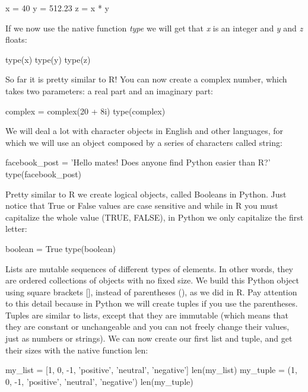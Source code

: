 \begin{examplepy}
x = 40
y = 512.23
z = x * y
\end{examplepy}

If we now use the native function \emph{type} we will get that \emph{x} is an integer and \emph{y} and \emph{z} floats:

\begin{examplepy}
type(x)
type(y)
type(z)
\end{examplepy}

So far it is pretty similar to R! You can now create a complex number, which takes two parameters: a real part and an imaginary part:

\begin{examplepy}
complex = complex(20 + 8i)
type(complex)
\end{examplepy}

We will deal a lot with character objects in English and other languages, for which we will use an object composed by a series of characters called string:

\begin{examplepy}
facebook_post = 'Hello mates! Does anyone find Python easier than R?'
type(facebook_post)
\end{examplepy}

Pretty similar to R we create logical objects, called Booleans in Python. Just notice that True or False values are case sensitive and while in R you must capitalize the whole value (TRUE, FALSE), in Python we only capitalize the first letter:

\begin{examplepy}
boolean = True
type(boolean)
\end{examplepy}

Lists are mutable sequences of different types of elements. In other words, they are ordered collections of objects with no fixed size. We build this Python object using square brackets [], instead of parentheses (), as we did in R. Pay attention to this detail because in Python we will create tuples if you use the parentheses. Tuples are similar to lists, except that they are immutable (which means that they are constant or unchangeable and you can not freely change their values, just as numbers or strings).  We can now create our first list and tuple, and get their sizes with the native function len:

\begin{examplepy}
my_list = [1, 0, -1, 'positive', 'neutral', 'negative']
len(my_list)
my_tuple = (1, 0, -1, 'positive', 'neutral', 'negative')
len(my_tuple)
\end{examplepy}
	
